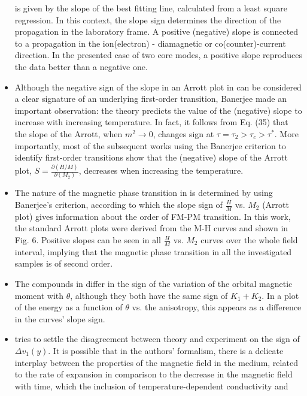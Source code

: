 \documentclass[11pt]{book}
\begin{document}
\begin{itemize}
is given by the slope of the best fitting line, calculated from a
least square regression. In this context, the slope sign determines
the direction of the propagation in the laboratory frame. A positive
(negative) slope is connected to a propagation in the ion(electron)
- diamagnetic or co(counter)-current direction. In the presented case
of two core modes, a positive slope reproduces the data better than
a negative one.
\item Although the negative sign of the slope in an Arrott plot in \cite{bustingorry2016second}
can be considered a clear signature of an underlying first-order transition,
Banerjee made an important observation: the theory predicts the value
of the (negative) slope to increase with increasing temperature. In
fact, it follows from Eq. (35) that the slope of the Arrott, when
$m^{2}\rightarrow0$, changes sign at $\tau=\tau_{2}>\tau_{c}>\tau^{\ast}$.
More importantly, most of the subsequent works using the Banerjee
criterion to identify first-order transitions show that the (negative)
slope of the Arrott plot, $S=\frac{\partial\left(H/M\right)}{\partial\left(M_{2}\right)}$,
decreases when increasing the temperature.
\item The nature of the magnetic phase transition in \cite{hussain2017magnetocaloric}
is determined by using Banerjee's criterion, according to which the
slope sign of $\frac{H}{M}$ vs. $M_{2}$ (Arrott plot) gives information
about the order of FM-PM transition. In this work, the standard Arrott
plots were derived from the M-H curves and shown in Fig. 6. Positive
slopes can be seen in all $\frac{H}{M}$ vs. $M_{2}$ curves over
the whole field interval, implying that the magnetic phase transition
in all the investigated samples is of second order.
\item The compounds in \cite{edstrom2017magnetocrystalline}
differ in the sign of the variation of the orbital magnetic moment
with $\theta$, although they both have the same sign of $K_{1}+K_{2}$.
In a plot of the energy as a function of $\theta$ vs. the anisotropy,
this appears as a difference in the curves' slope sign.
\item \cite{inghirami2020magnetic}
tries to settle the disagreement between theory and experiment on
the sign of $\Delta v_{1}\left(y\right)$. It is possible that in
the authors' formalism, there is a delicate interplay between the
properties of the magnetic field in the medium, related to the rate
of expansion in comparison to the decrease in the magnetic field with
time, which the inclusion of temperature-dependent conductivity and

\end{itemize}
\end{document}
